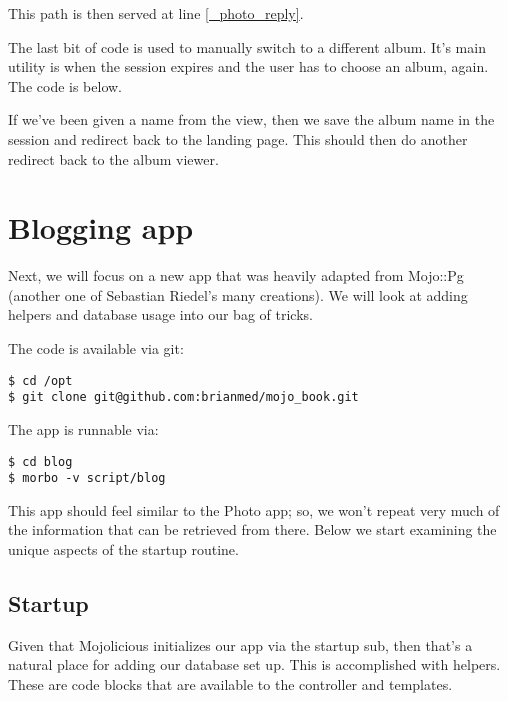 \documentclass[14pt]{extreport}
\begin{document}
This path is then served at line \ref{_photo_reply}.

The last bit of code is used to manually switch to a different album. It's main utility
is when the session expires and the user has to choose an album, again.  The code is
below.



If we've been given a name from the view, then we save the album name in the session and
redirect back to the landing page.  This should then do another redirect back to the
album viewer.

\section{Blogging app}

Next, we will focus on a new app that was heavily adapted from Mojo::Pg
(another one of Sebastian Riedel's many creations).  We will look at adding
helpers and database usage into our bag of tricks.

The code is available via git:

\begin{lstlisting}[style=BashOutputStyle]
$ cd /opt
$ git clone git@github.com:brianmed/mojo_book.git
\end{lstlisting}

The app is runnable via:

\begin{lstlisting}[style=BashInputStyle]
$ cd blog
$ morbo -v script/blog
\end{lstlisting}

This app should feel similar to the Photo app; so, we won't repeat very much of
the information that can be retrieved from there.  Below we start examining the
unique aspects of the startup routine.

\subsection{Startup}

Given that Mojolicious initializes our app via the startup sub, then that's a
natural place for adding our database set up.  This is accomplished with
helpers. These are code blocks that are available to the controller and
templates.


\end{document}
